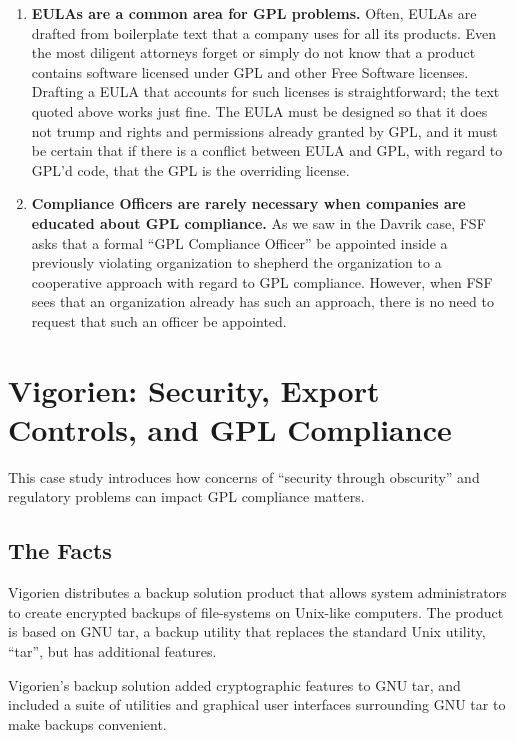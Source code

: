 \documentclass[12pt]{report}
\begin{document}
\begin{enumerate}
\item {\bf EULAs are a common area for GPL problems.}  Often, EULAs are
  drafted from boilerplate text that a company uses for all its products.
  Even the most diligent attorneys forget or simply do not know that a
  product contains software licensed under GPL and other Free Software
  licenses.  Drafting a EULA that accounts for such licenses is
  straightforward; the text quoted above works just fine.  The EULA must
  be designed so that it does not trump and rights and permissions already
  granted by GPL\@, and it must be certain that if there is a conflict
  between EULA and GPL, with regard to GPL'd code, that the GPL is the
  overriding license.

\item {\bf Compliance Officers are rarely necessary when companies are
  educated about GPL compliance.}  As we saw in the Davrik case, FSF asks
  that a formal ``GPL Compliance Officer'' be appointed inside a
  previously violating organization to shepherd the organization to a
  cooperative approach with regard to GPL compliance.  However, when FSF
  sees that an organization already has such an approach, there is no
  need to request that such an officer be appointed.

\end{enumerate}


\chapter{Vigorien: Security, Export Controls, and GPL Compliance}

This case study introduces how concerns of ``security through obscurity''
and regulatory problems can impact GPL compliance matters.

\section{The Facts}

Vigorien distributes a backup solution product that allows system
administrators to create encrypted backups of file-systems on Unix-like
computers.  The product is based on GNU tar, a backup utility that
replaces the standard Unix utility, ``tar'', but has additional features.

Vigorien's backup solution added cryptographic features to GNU tar, and
included a suite of utilities and graphical user interfaces surrounding
GNU tar to make backups convenient.
\end{document}

